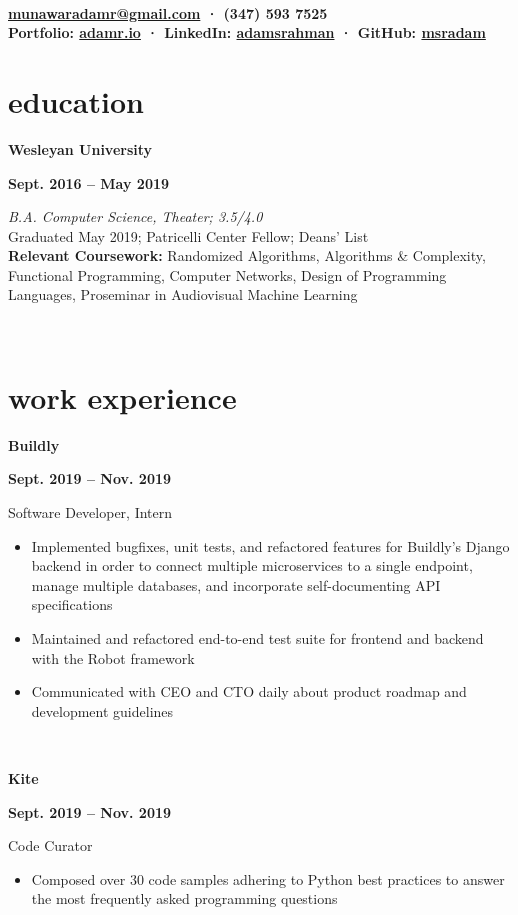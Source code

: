 \documentclass[letterpaper, 10.5pt]{article}
\author{Adam Rahman}
\makeatletter
\renewcommand{\maketitle}{
	\hspace{.125\textwidth}
	\begin{minipage}[t]{.75\textwidth}
    \begin{center}
        \fontsize{15pt}{15pt}\selectfont\bfseries \theauthor \\
        \fontsize{10pt}{15pt}\selectfont\sf
        \vspace{-0.5mm}
        \href{mailto:munawaradamr@gmail.com}{munawaradamr@gmail.com} · (347) 593 7525 \\
        \vspace{-0.5mm}
        Portfolio: \href{http://adamr.io}{adamr.io} · 
        LinkedIn: \href{https://www.linkedin.com/in/adamsrahman/}{adamsrahman} · 
        GitHub: \href{https://github.com/msradam}{msradam}  \\ 
        \end{center}
    \end{minipage}}
\newcommand{\eduentry}[4]{
        \begin{minipage}[b]{0.5\textwidth}
        \raggedright
        \bf\large #2
        \end{minipage}%
        \begin{minipage}[b]{0.5\textwidth}
        \raggedleft
        \bf #1
        \end{minipage}

    \begin{minipage}[t]{.80\linewidth}
    \vspace{-3mm}
    \textit{#3} \small{#4}
    \end{minipage}\\
    \vspace{1mm}
    }
\newcommand{\expentry}[5]{

    \begin{minipage}[b]{0.5\textwidth}
        \raggedright
        \bf\large #3
        \end{minipage}%
        \begin{minipage}[b]{0.5\textwidth}
        \raggedleft
        \bf {#1} -- {#2}
        \end{minipage}

    \begin{minipage}[t]{\linewidth}
    \vspace{-3mm}
    #4
    \vspace{-1.75mm}
    \small{#5}
    \end{minipage}\\
    \vspace{1mm}
    }
\makeatother
\begin{document}
    \maketitle
    \vspace{.075cm}


    \section{education}
    \eduentry{Sept. 2016 -- May 2019}
    {Wesleyan University}
    {B.A. Computer Science, Theater; 3.5/4.0}
    {\\ Graduated May 2019; Patricelli Center Fellow; Deans' List \\
    \textbf{Relevant Coursework:} Randomized Algorithms, Algorithms \& Complexity, Functional Programming, Computer Networks, Design of Programming Languages, Proseminar in Audiovisual Machine Learning}

    \section{work experience}
    \expentry{Sept. 2019}
    {Nov. 2019}
    {Buildly}
    {Software Developer, Intern}
    {
        \begin{itemize}
          \setlength\itemsep{-0.5mm}
          \item Implemented bugfixes, unit tests, and refactored features for Buildly's Django backend in order to connect multiple microservices to a single endpoint, manage multiple databases, and incorporate self-documenting API specifications
          \item Maintained and refactored end-to-end test suite for frontend and backend with the Robot framework
          \item Communicated with CEO and CTO daily about product roadmap and development guidelines
        \end{itemize}
        
    }

    \expentry{Sept. 2019}
    {Nov. 2019}
    {Kite}
    {Code Curator}
    {
        \begin{itemize}
          \setlength\itemsep{-0.5mm}
          \item Composed over 30 code samples adhering to Python best practices to answer the most frequently asked programming questions
         \end{itemize}
        
    }
\end{document}
